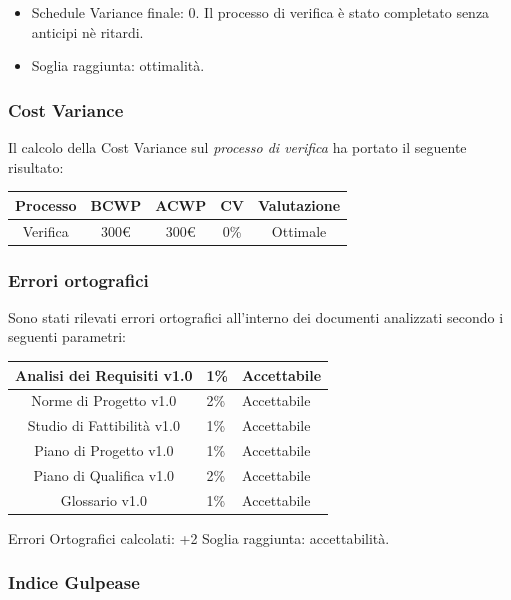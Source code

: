 \begin{itemize}
	\item Schedule Variance finale: 0. 
	Il processo di verifica è stato completato senza anticipi nè ritardi.
	
	\item Soglia raggiunta: ottimalità.
\end{itemize}


\subsubsection{Cost Variance}
Il calcolo della Cost Variance sul \emph{processo di verifica} ha portato il seguente risultato: 

{
	\renewcommand{\arraystretch}{2}
	\centering
	\begin{tabular}{| c | c | c | c | c |}
		\hline
		\textbf{Processo} & \textbf{BCWP} & \textbf{ACWP} & \textbf{CV} & \textbf{Valutazione} \\
		\hline
		Verifica & 300\euro & 300\euro & 0\% & Ottimale \\
		\hline
	\end{tabular}

}

\subsubsection{Errori ortografici}
Sono stati rilevati errori ortografici all'interno dei documenti analizzati secondo i seguenti parametri:
{
	\renewcommand{\arraystretch}{2}
	\centering
	\begin{tabular}{| c | C{1cm} | C{3cm} |}
			\hline
		Analisi dei Requisiti v1.0 & 1\% & Accettabile \\
			\hline
		Norme di Progetto v1.0 & 2\% & Accettabile\\
			\hline
		Studio di Fattibilità v1.0 & 1\% &  Accettabile \\
			\hline
		Piano di Progetto v1.0 & 1\% & Accettabile \\
			\hline
		Piano di Qualifica v1.0 & 2\% & Accettabile\\
			\hline
		Glossario v1.0 & 1\% & Accettabile\\
			\hline
	\end{tabular}

}

Errori Ortografici calcolati: +2%
Soglia raggiunta: accettabilità.


\subsubsection{Indice Gulpease}

